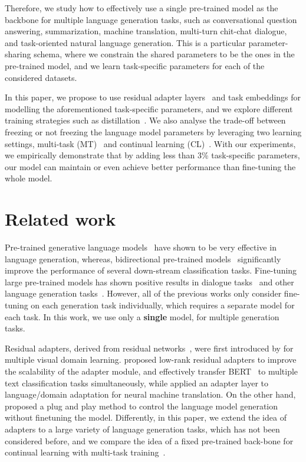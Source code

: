 Therefore, we study how to effectively use a single pre-trained model as the backbone for multiple language generation tasks, such as conversational question answering, summarization, machine translation, multi-turn chit-chat dialogue, and task-oriented natural language generation. This is a particular parameter-sharing schema, where we constrain the shared parameters to be the ones in the pre-trained model, and we learn task-specific parameters for each of the considered datasets. 

In this paper, we propose to use residual adapter layers~\cite{houlsby2019parameter} and task embeddings for modelling the aforementioned task-specific parameters, and we explore different training strategies such as distillation~\cite{hinton2015distilling,kim2016sequence}. We also analyse the trade-off between freezing or not freezing the language model parameters by leveraging two learning settings, multi-task (MT)~\cite{caruana1997multitask} and continual learning (CL)~\cite{thrun2012learning}. With our experiments, we empirically demonstrate that by adding less than 3\% task-specific parameters, our model can maintain or even achieve better performance than fine-tuning the whole model.

\section{Related work} Pre-trained generative language models~\cite{radford2019language,radford2018improving,dai-etal-2019-transformer,yang2019xlnet,peters2018deep} have shown to be very effective in language generation, whereas, bidirectional pre-trained models~\cite{devlin2019bert,liu2019roberta,sanh2019distilbert} significantly improve the performance of several down-stream classification tasks. Fine-tuning large pre-trained models has shown positive results in dialogue tasks~\cite{DBLP:journals/corr/abs-1901-08149, budzianowski2019hello} and other language generation tasks~\cite{dong2019unified}. However, all of the previous works only consider fine-tuning on each generation task individually, which requires a separate model for each task. In this work, we use only a \textbf{single} model, for multiple generation tasks. 

Residual adapters, derived from residual networks~\cite{he2016deep}, were first introduced by \citet{rebuffi2017learning} for multiple visual domain learning.
\citet{houlsby2019parameter} proposed low-rank residual adapters to improve the scalability of the adapter module, and effectively transfer BERT~\cite{devlin2019bert} to multiple text classification tasks simultaneously, while \citet{bapna2019simple} applied an adapter layer to language/domain adaptation for neural machine translation. On the other hand,  \citet{dathathri2019plug} proposed a plug and play method to control the language model generation without finetuning the model. Differently, in this paper, we extend the idea of adapters to a large variety of language generation tasks, which has not been considered before, and we compare the idea of a fixed pre-trained back-bone for continual learning with multi-task training~\cite{stickland2019bert}.

